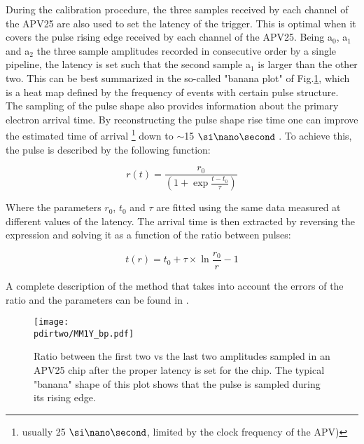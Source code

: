 During the calibration procedure, the three samples received by each channel of the APV25 are also used to set the latency of the trigger. This is optimal when it covers the pulse rising edge received by each channel of the APV25. Being a$_0$, a$_1$ and a$_2$ the three sample amplitudes recorded in consecutive order by a single pipeline, the latency is set such that the second sample a$_1$ is larger than the other two. This can be best summarized in the so-called "banana plot" of Fig.\ref{fig:banana-plot}, which is a heat map defined by the frequency of events with certain pulse structure. The sampling of the pulse shape also provides information about the primary electron arrival time. By reconstructing the pulse shape rise time one can improve the estimated time of arrival \footnote{usually 25 $\nas$, limited by the clock frequency of the APV)} down to $\sim$15 $\nas$ \cite{Banerjee:2017mdu}. To achieve this, the pulse is described by the following function:

\begin{equation}
\label{eq:apv-pulse}
r(t) = \frac{r_0}{(1 + \exp{\frac{t-t_0}{\tau}})}
\end{equation}

Where the parameters $r_0$, $t_0$ and $\tau$ are fitted using the same data measured at different values of the latency. The arrival time is then extracted by reversing the expression and solving it as a function of the ratio between pulses:

\begin{equation}
\label{eq:2}
t(r) = t_0 + \tau \times \ln{\frac{r_0}{r} - 1}
\end{equation}

A complete description of the method that takes into account the errors of the ratio and the parameters can be found in \cite{dbanerjee-thesis}.

\begin{figure}[!bth]
  \centering
  \texttt{[image: \\pdirtwo/MM1Y\_bp.pdf]}
\caption[APV25 banana plot]{Ratio between the first two vs the last two amplitudes sampled in an APV25 chip after the proper latency is set for the chip. The typical "banana" shape of this plot shows that the pulse is sampled during its rising edge.}
\label{fig:banana-plot}
\end{figure}

